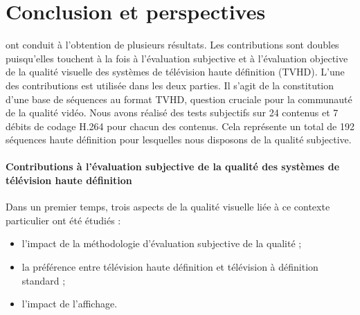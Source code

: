 
\chapter*{Conclusion et perspectives}
 ont conduit à l’obtention de plusieurs résultats. Les contributions sont doubles puisqu’elles touchent à la fois à l'évaluation subjective et à l'évaluation objective de la qualité visuelle des systèmes de télévision haute définition (TVHD). L'une des contributions est utilisée dans les deux parties. Il s'agit de la constitution d'une base de séquences au format TVHD, question cruciale pour la communauté de la qualité vidéo. Nous avons réalisé des tests subjectifs sur 24 contenus et 7 débits de codage H.264 pour chacun des contenus. Cela représente un total de 192 séquences haute définition pour lesquelles nous disposons de la qualité subjective.


\subsubsection*{Contributions à l'évaluation subjective de la qualité des systèmes de télévision haute définition}
Dans un premier temps, trois aspects de la qualité visuelle liée à ce contexte particulier ont été étudiés :
\begin{itemize}
\item l'impact de la méthodologie d’évaluation subjective de la qualité ;
\item la préférence entre télévision haute définition et télévision à définition standard ;
\item l'impact de l'affichage.
\end{itemize}

